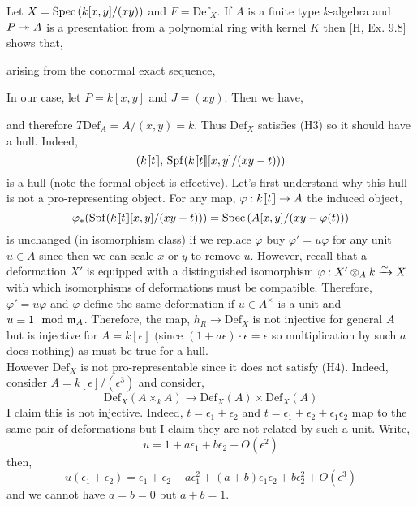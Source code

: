 \documentclass[12pt]{article}
\newcommand{\Def}{\mathrm{Def}}
\newcommand{\Spf}[1]{\mathrm{Spf} \! \left(#1 \right)}
\begin{document}
\begin{example}
Let $X = \mathrm{Spec}\left( k[x,y]/(xy) \right)$ and $F = \Def_X$. If $A$ is a finite type $k$-algebra and $P \twoheadrightarrow A$ is a presentation from a polynomial ring with kernel $K$ then [H, Ex. 9.8] shows that,
\begin{center}
\end{center}
arising from the conormal exact sequence,
\begin{center}
\end{center}
In our case, let $P = k[x,y]$ and $J = (xy)$. Then we have,
\begin{center}
\end{center}
and therefore $T \Def_A = A/(x,y) = k$. Thus $\Def_X$ satisfies (H3) so it should have a hull. Indeed,
\[ (k\dbrac{t}, \, \Spf{k\dbrac{t}[x,y]/(xy - t)}) \]
is a hull (note the formal object is effective). Let's first understand why this hull is not a pro-representing object. For any map, $\varphi : k\llbracket t \rrbracket \to A$ the induced object,
\[ \varphi_*(\Spf{k\dbrac{t}[x,y]/(xy - t)}) = \Spec{A[x,y]/(xy - \varphi(t))} \]
is unchanged (in isomorphism class) if we replace $\varphi$ buy $\varphi' = u \varphi$ for any unit $u \in A$ since then we can scale $x$ or $y$ to remove $u$. However, recall that a deformation $X'$ is equipped with a distinguished isomorphism $\varphi : X' \otimes_A k \xrightarrow{\sim} X$ with which isomorphisms of deformations must be compatible. Therefore, $\varphi' = u \varphi$ and $\varphi$ define the same deformation if $u \in A^\times$ is a unit and $u \equiv 1 \mod {\mathfrak{m}}_A$. Therefore, the map, $h_R \to \Def_X$ is not injective for general $A$ but is injective for $A = k[\epsilon]$ (since $(1 +  a \epsilon) \cdot \epsilon = \epsilon$ so multiplication by such $a$ does nothing) as must be true for a hull.  
\bigskip\\
However $\Def_X$ is not pro-representable since it does not satisfy (H4). Indeed, consider $A = k[\epsilon]/(\epsilon^3)$ and consider,
\[ \Def_X(A \times_k A) \to \Def_X(A) \times \Def_X(A) \]
I claim this is not injective. Indeed, $t = \epsilon_1 + \epsilon_2$ and $t = \epsilon_1 + \epsilon_2 + \epsilon_1 \epsilon_2$ map to the same pair of deformations but I claim they are not related by such a unit. Write,
\[ u = 1 + a \epsilon_1 + b \epsilon_2 + O(\epsilon^2) \]
then,
\[ u (\epsilon_1 + \epsilon_2) = \epsilon_1 + \epsilon_2 + a \epsilon_1^2 + (a + b) \epsilon_1 \epsilon_2 + b \epsilon_2^2 + O(\epsilon^3) \] 
and we cannot have $a = b = 0$ but $a + b = 1$.
\end{example}
\end{document}
